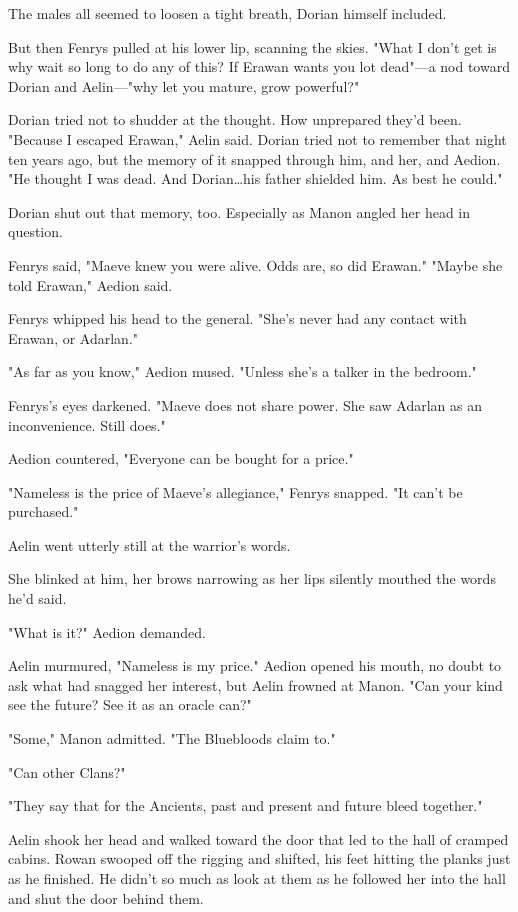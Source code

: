 The males all seemed to loosen a tight breath, Dorian himself included.

But then Fenrys pulled at his lower lip, scanning the skies.
"What I don't get is why wait so long to do any of this?
If Erawan wants you lot dead"---a nod toward Dorian and Aelin---"why let you mature, grow powerful?"

Dorian tried not to shudder at the thought.
How unprepared they'd been.
"Because I escaped Erawan," Aelin said.
Dorian tried not to remember that night ten years ago, but the memory of it snapped through him, and her, and Aedion.
"He thought I was dead.
And Dorian\ldots his father shielded him.
As best he could."

Dorian shut out that memory, too.
Especially as Manon angled her head in question.

Fenrys said, "Maeve knew you were alive.
Odds are, so did Erawan."
"Maybe she told Erawan," Aedion said.

Fenrys whipped his head to the general.
"She's never had any contact with Erawan, or Adarlan."

"As far as you know," Aedion mused.
"Unless she's a talker in the bedroom."

Fenrys's eyes darkened.
"Maeve does not share power.
She saw Adarlan as an inconvenience.
Still does."

Aedion countered, "Everyone can be bought for a price."

"Nameless is the price of Maeve's allegiance," Fenrys snapped.
"It can't be purchased."

Aelin went utterly still at the warrior's words.

She blinked at him, her brows narrowing as her lips silently mouthed the words he'd said.

"What is it?"
Aedion demanded.

Aelin murmured, "Nameless is my price."
Aedion opened his mouth, no doubt to ask what had snagged her interest, but Aelin frowned at Manon.
"Can your kind see the future?
See it as an oracle can?"

"Some," Manon admitted.
"The Bluebloods claim to."

"Can other Clans?"

"They say that for the Ancients, past and present and future bleed together."

Aelin shook her head and walked toward the door that led to the hall of cramped cabins.
Rowan swooped off the rigging and shifted, his feet hitting the planks just as he finished.
He didn't so much as look at them as he followed her into the hall and shut the door behind them.

